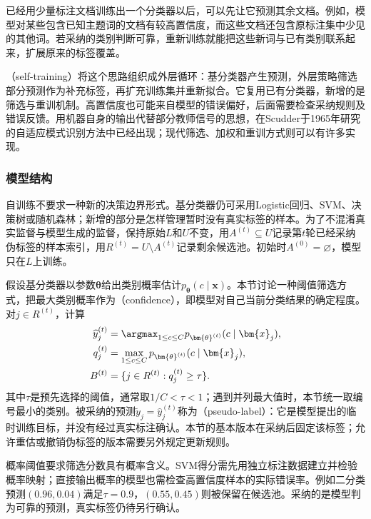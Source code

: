 已经用少量标注文档训练出一个分类器以后，可以先让它预测其余文档。例如，模型对某些包含已知主题词的文档有较高置信度，而这些文档还包含原标注集中少见的其他词。若采纳的类别判断可靠，重新训练就能把这些新词与已有类别联系起来，扩展原来的标签覆盖。

（self-training）将这个思路组织成外层循环：基分类器产生预测，外层策略筛选部分预测作为补充标签，再扩充训练集并重新拟合。它复用已有分类器，新增的是筛选与重训机制。高置信度也可能来自模型的错误偏好，后面需要检查采纳规则及错误反馈。用机器自身的输出代替部分教师信号的思想，在Scudder于1965年研究的自适应模式识别方法中已经出现；现代筛选、加权和重训方式则可以有许多实现。

\subsubsection{模型结构}
\label{sec:classification-self-training-structure}

自训练不要求一种新的决策边界形式。基分类器仍可采用Logistic回归、SVM、决策树或随机森林；新增的部分是怎样管理暂时没有真实标签的样本。为了不混淆真实监督与模型生成的监督，保持原始$L$和$U$不变，用$A^{(t)}\subseteq U$记录第$t$轮已经采纳伪标签的样本索引，用$R^{(t)}=U\setminus A^{(t)}$记录剩余候选池。初始时$A^{(0)}=\varnothing$，模型只在$L$上训练。

假设基分类器以参数$\bm{\theta}$给出类别概率估计$p_{\bm{\theta}}(c\mid\bm{x})$。本节讨论一种阈值筛选方式，把最大类别概率作为（confidence），即模型对自己当前分类结果的确定程度。对$j\in R^{(t)}$，计算
\begin{equation}
  \label{eq:classification-self-training-selection}
  \begin{aligned}
    \widehat y_j^{(t)}
      &=\argmax_{1\leq c\leq C}
        p_{\bm{\theta}^{(t)}}(c\mid\bm{x}_j),\\
    q_j^{(t)}
      &=\max_{1\leq c\leq C}
        p_{\bm{\theta}^{(t)}}(c\mid\bm{x}_j),\\
    B^{(t)}
      &=\{j\in R^{(t)}:q_j^{(t)}\geq\tau\}.
  \end{aligned}
\end{equation}
其中$\tau$是预先选择的阈值，通常取$1/C<\tau<1$；遇到并列最大值时，本节统一取编号最小的类别。被采纳的预测$\widetilde y_j=\widehat y_j^{(t)}$称为（pseudo-label）：它是模型提出的临时训练目标，并没有经过真实标注确认。本节的基本版本在采纳后固定该标签；允许重估或撤销伪标签的版本需要另外规定更新规则。

概率阈值要求筛选分数具有概率含义。SVM得分需先用独立标注数据建立并检验概率映射；直接输出概率的模型也需检查高置信度样本的实际错误率。例如二分类预测$(0.96,0.04)$满足$\tau=0.9$，$(0.55,0.45)$则被保留在候选池。采纳的是模型判为可靠的预测，真实标签仍待另行确认。

